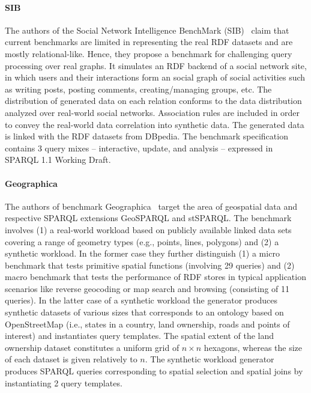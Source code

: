 \paragraph{SIB} The authors of the Social Network Intelligence BenchMark (SIB)~\cite{sib} claim that current benchmarks are limited in representing the real RDF datasets and are mostly relational-like. Hence, they propose a benchmark for challenging query processing over real graphs. It simulates an RDF backend of a social network site, in which users and their interactions form an social graph of social activities such as writing posts, posting comments, creating/managing groups, etc. The distribution of generated data on each relation conforms to the data distribution analyzed over real-world social networks. Association rules are included in order to convey the real-world data correlation into synthetic data. The  generated data is linked with the RDF datasets from DBpedia. The benchmark specification contains 3 query mixes -- interactive, update, and analysis -- expressed in SPARQL 1.1 Working Draft.

\paragraph{Geographica} The authors of benchmark Geographica~\cite{DBLP:conf/semweb/GarbisKK13} target the area of geospatial data and respective SPARQL extensions GeoSPARQL and stSPARQL. The benchmark involves (1) a real-world workload based on publicly available linked data sets covering a range of geometry types (e.g., points, lines, polygons) and (2) a synthetic workload. In the former case they further distinguish (1) a micro benchmark that tests primitive spatial functions (involving 29 queries) and (2) macro benchmark that tests the performance of RDF stores in typical application scenarios like reverse geocoding or map search and browsing (consisting of 11 queries). In the latter case of a synthetic workload the generator produces synthetic datasets of various sizes that corresponds to an ontology based on OpenStreetMap (i.e., states in a country, land ownership, roads and  points of interest) and instantiates query templates. The spatial extent of the land ownership dataset constitutes a uniform grid of $n \times n$ hexagons, whereas the size of each dataset is given relatively to $n$. The synthetic workload generator produces SPARQL queries corresponding to spatial selection and spatial joins by instantiating 2 query templates.


